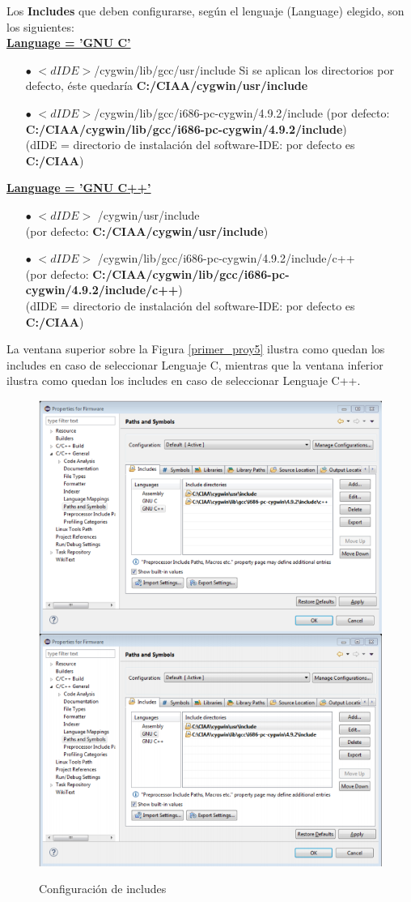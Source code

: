\documentclass[12pt,letterpaper]{article}
\begin{document}
Los \textbf{Includes} que deben configurarse, según el lenguaje (Language) elegido, son los siguientes:\\

\underline{\textbf{Language = 'GNU C'}}\\
\begin{enumerate}
\item[$\bullet$] $<dIDE>$/cygwin/lib/gcc/usr/include Si se aplican los directorios por defecto, éste quedaría
\textbf{C:/CIAA/cygwin/usr/include}
\item[$\bullet$] $<dIDE>$/cygwin/lib/gcc/i686-pc-cygwin/4.9.2/include (por defecto: \textbf{C:/CIAA/cygwin/lib/gcc/i686-pc-cygwin/4.9.2/include})\\
 (dIDE = directorio de instalación del software-IDE: por defecto es \textbf{C:/CIAA})
\end{enumerate}

\underline{\textbf{Language = 'GNU C++'}}\\
\begin{enumerate}
\item[$\bullet$] $<dIDE>$ /cygwin/usr/include\\
(por defecto: \textbf{C:/CIAA/cygwin/usr/include})
\item[$\bullet$] $<dIDE>$  /cygwin/lib/gcc/i686-pc-cygwin/4.9.2/include/c++\\
(por defecto: \textbf{C:/CIAA/cygwin/lib/gcc/i686-pc-cygwin/4.9.2/include/c++})\\
 (dIDE = directorio de instalación del software-IDE: por defecto es \textbf{C:/CIAA})
\end{enumerate}
La ventana superior sobre la Figura \ref{primer_proy5} ilustra como quedan los includes en caso de seleccionar Lenguaje C, mientras que la ventana inferior ilustra como quedan los includes en caso de seleccionar Lenguaje C++.

\begin{center}
\begin{figure}[!h]
\centering
\includegraphics[width=8 cm]{figuras/primer_proy6.png}\\
\caption{Configuración de includes}
\label{primer_proy6}
\end{figure}
\end{center}
\end{document}
